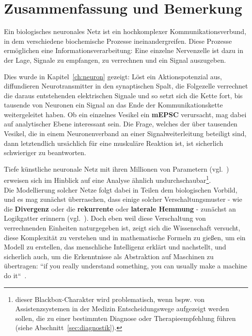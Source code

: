 \chapter{Zusammenfassung und Bemerkung}



Ein biologisches neuronales Netz ist ein hochkomplexer Kommunikationsverbund, in dem verschiedene biochemische Prozesse ineinandergreifen.
Diese Prozesse ermöglichen eine Informationsverarbeitung: Eine einzelne Nervenzelle ist dazu in der Lage, Signale zu empfangen, zu verrechnen und ein Signal auszugeben.


Dies wurde in Kapitel~\ref{ch:neuron} gezeigt: Löst ein Aktionspotenzial aus, diffundieren Neurotransmitter in den synaptischen Spalt, die Folgezelle verrechnet die daraus entstehenden elektrischen Signale und so setzt sich die Kette fort, bis tausende von Neuronen ein Signal an das Ende der Kommunikationskette weitergeleitet haben.
Ob ein einzelnes Vesikel ein \textbf{mEPSC} verursacht, mag dabei auf analytischer Ebene interessant sein.
Die Frage, welches der über tausenden Vesikel, die in einem Neuronenverband an einer Signalweiterleitung beteiligt sind, dann letztendlich ursächlich für eine muskuläre Reaktion ist, ist sicherlich schwieriger zu beantworten.

Tiefe künstliche neuronale Netz mit ihren Millionen von Parametern (vgl.~\cite{SVI+15}) erweisen sich im Hinblick auf eine Analyse ähnlich undurchschaubar\footnote{ dieser Blackbox-Charakter wird problematisch, wenn {bspw.} von Assistenzsystemen in der Medizin Entscheidungswege aufgezeigt werden sollen, die zu einer bestimmten Diagnose oder Therapieempfehlung führen (siehe Abschnitt~\ref{sec:diagnostik}).}.\\

Die Modellierung solcher Netze folgt dabei in Teilen dem biologischen Vorbild, und es mag zunächst überraschen, dass einige solcher Verschaltungsmuster - wie die \textbf{Divergenz} oder die \textbf{rekurrente} oder \textbf{laterale Hemmung} - zunächst an Logikgatter erinnern (vgl.~\cite[58 f.]{Eil19}). Doch eben weil diese Verschaltung von verrechnenden Einheiten naturgegeben ist, zeigt sich die Wissenschaft versucht, diese Komplexität zu verstehen und in mathematische Formeln zu gießen, um ein Modell zu erstellen, das menschliche Intelligenz erklärt und nachstellt, und sicherlich auch, um die Erkenntnisse als Abstraktion auf Maschinen zu übertragen: ``if you really understand something, you can usually make a machine do it``~\cite[xiii]{AR88}.\\

